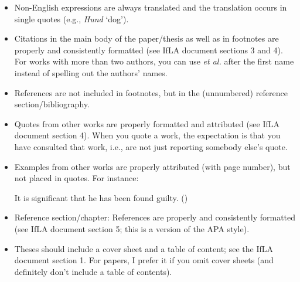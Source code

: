 \documentclass[11pt,fleqn,a4paper/thesis]{article}
\newcommand{\6}{\mbox{$[\hspace*{-.6mm}[$}}
\newcommand{\9}{\mbox{$]\hspace*{-.6mm}]$}}
\begin{document}
\begin{itemize}[itemsep=-1pt,leftmargin=2.5ex,topsep=-2pt]
\item Non-English expressions are always translated and the translation occurs in single quotes (e.g., {\em Hund} `dog').

\item Citations in the main body of the paper/thesis as well as in footnotes are properly and consistently formatted (see IfLA document sections 3 and 4). For works with more than two authors, you can use {\em et al.} after the first name instead of spelling out the authors' names. 

\item References are not included in footnotes, but in the (unnumbered) reference section/bibliography.

\item Quotes from other works are properly formatted and attributed (see IfLA document section 4). When you quote a work, the expectation is that you have consulted that work, i.e., are not just reporting somebody else's quote.

\item Examples from other works are properly attributed (with page number), but not placed in quotes. For instance:

\begin{exe}
\ex It is significant that he has been found guilty. \hfill (\citealt[144]{kiparsky-kiparsky70})
\end{exe}

\item Reference section/chapter: References are properly and consistently formatted (see IfLA document section 5; this is a version of the APA style).

\item Theses should include a cover sheet and a table of content; see the IfLA document section 1. For papers, I prefer it if you omit cover sheets (and definitely don't include a table of contents).

\end{itemize}
	


\end{document}
